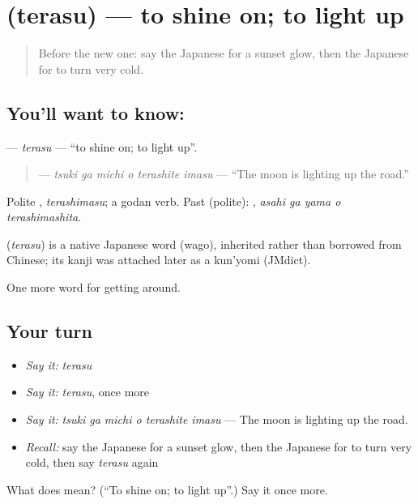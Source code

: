 \section[\texorpdfstring{\ja{てらす} (terasu)}{てらす (terasu)}]{ (terasu) — to shine on; to light up}

\label{lesson:JA-C416-terasu}



\begin{quote}
Before the new one: say the Japanese for a sunset glow, then the Japanese for to turn very cold.
\end{quote}

\subsection*{You'll want to know: }
\textbf{} — \emph{terasu} — \textquotedblleft{}to shine on; to light up\textquotedblright{}.

\begin{quote}
\textbf{  } — \emph{tsuki ga michi o terashite imasu} — \textquotedblleft{}The moon is lighting up the road.\textquotedblright{}
\end{quote}

Polite \textbf{}, \emph{terashimasu}; a godan verb. Past (polite): \textbf{  }, \emph{asahi ga yama o terashimashita}.

\begin{cousinweb}
\textbf{} (\emph{terasu}) is a native Japanese word (wago), inherited rather than borrowed from Chinese; its kanji was attached later as a kun'yomi (JMdict).
\end{cousinweb}

\begin{grammarlens}[title={What you've built}]
One more word for getting around.
\end{grammarlens}

\subsection*{Your turn}
\begin{itemize}
\raggedright
  \item \emph{Say it:} \emph{terasu}
  \item \emph{Say it:} \emph{terasu}, once more
  \item \emph{Say it:} \emph{tsuki ga michi o terashite imasu} — The moon is lighting up the road.
  \item \emph{Recall:} say the Japanese for a sunset glow, then the Japanese for to turn very cold, then say \emph{terasu} again
\end{itemize}

\begin{tcolorbox}[breakable,colback=teal!4,colframe=teal!35!black,title={Before you move on}]
What does  mean? (\textquotedblleft{}To shine on; to light up\textquotedblright{}.) Say it once more.
\end{tcolorbox}
